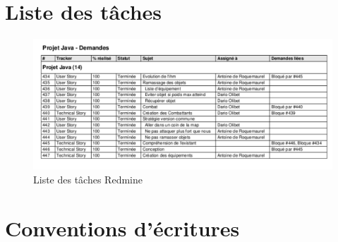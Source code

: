 \documentclass[12pt,a4paper,openany]{book}
\let\pagebreakORIG\pagebreak
\let\clearpageORIG\clearpage
\let\cleardoublepageORIG\cleardoublepage
\newcommand{\restorepagebreak}{\renewcommand{\pagebreak}{\pagebreakORIG}\renewcommand{\clearpage}{\clearpageORIG}\renewcommand{\cleardoublepage}{\cleardoublepageORIG}}
\begin{document}
	\chapter{Liste des tâches}
	\begin{figure}[H]
		\centering
		\includegraphics[width=14cm]{tachesRedmine.pdf}
		\caption{Liste des tâches Redmine}
	\end{figure}
	\vfill
	\label{conventions}
	\chapter{Conventions d'écritures}
	
\listoffigures
	\vfill
	\vfill
\listoftables
	\vfill
	\restorepagebreak
	
\end{document}
